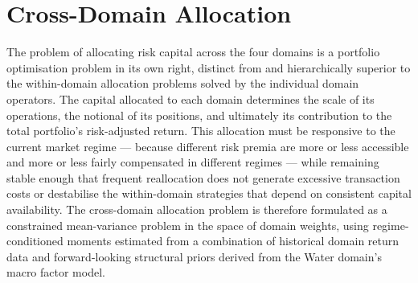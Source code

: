 \documentclass[12pt,openany]{book}
\numberwithin{equation}{chapter}
\theoremstyle{plain}
\theoremstyle{definition}
\theoremstyle{remark}
\begin{document}
\section{Cross-Domain Allocation}

The problem of allocating risk capital across the four domains is a portfolio optimisation problem in its own right, distinct from and hierarchically superior to the within-domain allocation problems solved by the individual domain operators. The capital allocated to each domain determines the scale of its operations, the notional of its positions, and ultimately its contribution to the total portfolio's risk-adjusted return. This allocation must be responsive to the current market regime — because different risk premia are more or less accessible and more or less fairly compensated in different regimes — while remaining stable enough that frequent reallocation does not generate excessive transaction costs or destabilise the within-domain strategies that depend on consistent capital availability. The cross-domain allocation problem is therefore formulated as a constrained mean-variance problem in the space of domain weights, using regime-conditioned moments estimated from a combination of historical domain return data and forward-looking structural priors derived from the Water domain's macro factor model.
\end{document}
